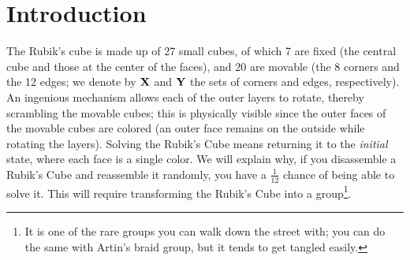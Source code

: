\section*{Introduction}

The Rubik's cube is made up of 27 small cubes, of which 7 are fixed (the central cube and those at the center of the faces), and 20 are movable (the 8 corners and the 12 edges; we denote by $\mathbf{X}$ and $\mathbf{Y}$ the sets of corners and edges, respectively).
An ingenious mechanism allows each of the outer layers to rotate, thereby scrambling the movable cubes; this is physically visible since the outer faces of the movable cubes are colored (an outer face remains on the outside while rotating the layers). Solving the Rubik's Cube means returning it to the \emph{initial} state, where each face is a single color.
We will explain why, if you disassemble a Rubik's Cube and reassemble it randomly, you have a $\frac{1}{12}$ chance of being able to solve it. This will require transforming the Rubik's Cube into a group\footnote{It is one of the rare groups you can walk down the street with; you can do the same with Artin's braid group, but it tends to get tangled easily.}.
